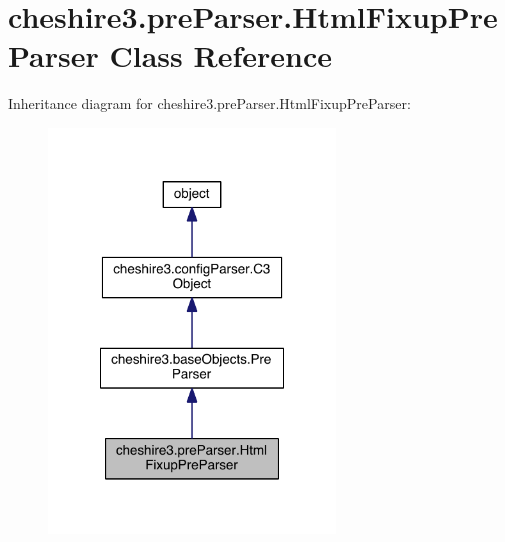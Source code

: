 \hypertarget{classcheshire3_1_1pre_parser_1_1_html_fixup_pre_parser}{\section{cheshire3.\-pre\-Parser.\-Html\-Fixup\-Pre\-Parser Class Reference}
\label{classcheshire3_1_1pre_parser_1_1_html_fixup_pre_parser}
}


Inheritance diagram for cheshire3.\-pre\-Parser.\-Html\-Fixup\-Pre\-Parser\-:
\nopagebreak
\begin{figure}[H]
\begin{center}
\leavevmode
\includegraphics[width=216pt]{classcheshire3_1_1pre_parser_1_1_html_fixup_pre_parser__inherit__graph}
\end{center}
\end{figure}


